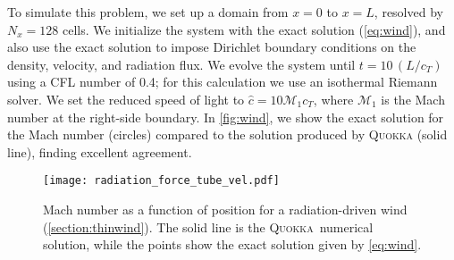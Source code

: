 \documentclass[fleqn,usenatbib]{mnras}
\newcommand{\quokka}{\textsc{Quokka}}
\begin{document}
To simulate this problem, we set up a domain from $x = 0$ to $x=L$, resolved by $N_x = 128$ cells. We initialize the system with the exact solution (\autoref{eq:wind}), and also use the exact solution to impose Dirichlet boundary conditions on the density, velocity, and radiation flux. We evolve the system until $t=10\,(L/c_T)$ using a CFL number of 0.4; for this calculation we use an isothermal Riemann solver. We set the reduced speed of light to $\hat c = 10 \mathcal{M}_1 c_T$, where $\mathcal{M}_1$ is the Mach number at the right-side boundary. In \autoref{fig:wind}, we show the exact solution for the Mach number (circles) compared to the solution produced by \textsc{Quokka} (solid line), finding excellent agreement.
\begin{figure}
    \texttt{[image: radiation\_force\_tube\_vel.pdf]}
    \caption{Mach number as a function of position for a radiation-driven wind (\autoref{section:thinwind}). The solid line is the \quokka~numerical solution, while the points show the exact solution given by \autoref{eq:wind}.}
    \label{fig:wind}
\end{figure}
\end{document}
